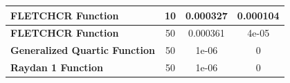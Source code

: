 \documentclass{article}
\begin{document}
\begin{table}[H]
\begin{tabular}{|l|c|c|c|}
		\textbf{FLETCHCR Function}                                         & 10                     & 0.000327                                                                                          & 0.000104                                                                                      \\ \hline
		\textbf{FLETCHCR Function}                                         & 50                     & 0.000361                                                                                          & 4e-05                                                                                         \\ \hline
		\textbf{Generalized Quartic Function}                              & 50                     & 1e-06                                                                                             & 0                                                                                             \\ \hline
		\textbf{Raydan 1 Function}                                         & 50                     & 1e-06                                                                                             & 0                                                                                             \\ \hline
	\end{tabular}
\end{table}
\end{document}
